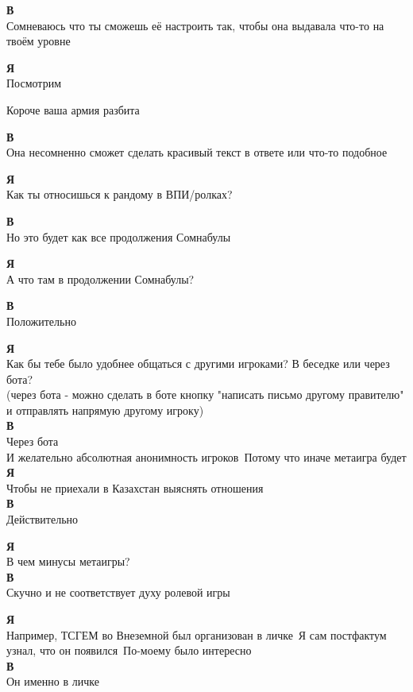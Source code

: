 \textbf{В}\\
Сомневаюсь что ты сможешь её настроить так, чтобы она выдавала что-то на твоём уровне

\textbf{Я}\\
Посмотрим

Короче ваша армия разбита

\textbf{В}\\
Она несомненно сможет сделать красивый текст в ответе или что-то подобное

\textbf{Я}\\
Как ты относишься к рандому в ВПИ/ролках?

\textbf{В}\\
Но это будет как все продолжения Сомнабулы

\textbf{Я}\\
А что там в продолжении Сомнабулы?

\textbf{В}\\
Положительно

\textbf{Я}\\
Как бы тебе было удобнее общаться с другими игроками? В беседке или через бота?\\
(через бота - можно сделать в боте кнопку "написать письмо другому правителю" и отправлять напрямую другому игроку)\\

\textbf{В}\\
Через бота\\
И желательно абсолютная анонимность игроков\
Потому что иначе метаигра будет\\

\textbf{Я}\\
Чтобы не приехали в Казахстан выяснять отношения\\

\textbf{В}\\
Действительно

\textbf{Я}\\
В чем минусы метаигры?\\

\textbf{В}\\
Скучно и не соответствует духу ролевой игры

\textbf{Я}\\
Например, ТСГЕМ во Внеземной был организован в личке\
Я сам постфактум узнал, что он появился\
По-моему было интересно\\

\textbf{В}\\
Он именно в личке\\

